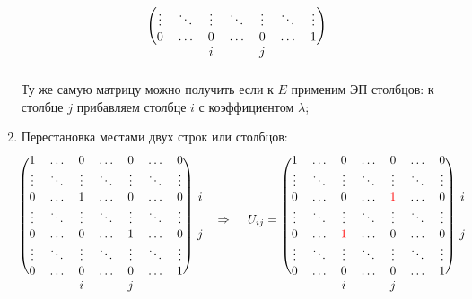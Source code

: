 \documentclass[12pt]{article}
\theoremstyle{definition}
\begin{document}
\begin{enumerate}[label = \arabic*)]
$$\begin{blockarray}{ccccccccc}
\begin{block}{c(ccccccc)c}
				&\vdots & \ddots & \vdots & \ddots & \vdots & \ddots & \vdots &\\
				&0 & \dotsc & 0 & \dotsc & 0 & \dotsc & 1 &\\
			\end{block}
			&&  & i &  & j &  &  &\\
		\end{blockarray}
	$$
	Ту же самую матрицу можно получить если к $E$ применим ЭП столбцов: к столбце $j$ прибавляем столбце $i$ с коэффициентом $\lambda$;
	\item Перестановка местами двух строк или столбцов:
	$$
		\begin{blockarray}{ccccccccc}
			\begin{block}{(ccccccc)cc}
				1 & \dotsc & 0 & \dotsc & 0 & \dotsc & 0 & &\\
				\vdots & \ddots & \vdots & \ddots & \vdots & \ddots & \vdots & &\\
				0 & \dotsc & 1 & \dotsc & 0 & \dotsc & 0 & i&\\
				\vdots & \ddots & \vdots & \ddots & \vdots & \ddots & \vdots & &\Rightarrow\\
				0 & \dotsc & 0 & \dotsc & 1 & \dotsc & 0 & j\\
				\vdots & \ddots & \vdots & \ddots & \vdots & \ddots & \vdots &&\\
				0 & \dotsc & 0 & \dotsc & 0 & \dotsc & 1 &&\\
			\end{block}
			&  & i &  & j &  &  &&\\
		\end{blockarray}	
		\begin{blockarray}{ccccccccc}
			\begin{block}{c(ccccccc)c}
				& 1 & \dotsc & 0 & \dotsc & 0 & \dotsc & 0 & \\
				& \vdots & \ddots & \vdots & \ddots & \vdots & \ddots & \vdots & \\
				& 0 & \dotsc & 0 & \dotsc & {\color{red}1} & \dotsc & 0 & i\\
				U_{ij} =& \vdots & \ddots & \vdots & \ddots & \vdots & \ddots & \vdots & \\
				&0 & \dotsc & {\color{red}1} & \dotsc & 0 & \dotsc & 0 & j\\
				&\vdots & \ddots & \vdots & \ddots & \vdots & \ddots & \vdots &\\
				&0 & \dotsc & 0 & \dotsc & 0 & \dotsc & 1 &\\
			\end{block}
			&&  & i &  & j &  &  &\\

\end{blockarray}$$
\end{enumerate}
\end{document}
